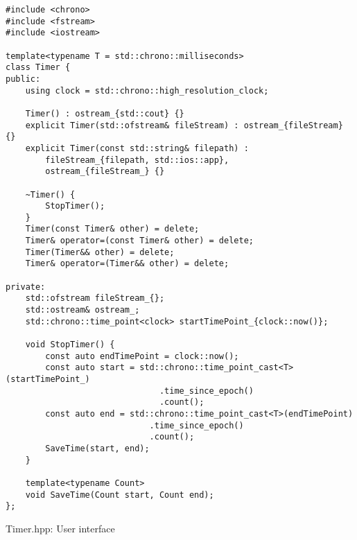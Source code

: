 \begin{listing}[!htb]
\begin{verbatim}
#include <chrono>
#include <fstream>
#include <iostream>

template<typename T = std::chrono::milliseconds>
class Timer {
public:
    using clock = std::chrono::high_resolution_clock;

    Timer() : ostream_{std::cout} {}
    explicit Timer(std::ofstream& fileStream) : ostream_{fileStream} {}
    explicit Timer(const std::string& filepath) :
        fileStream_{filepath, std::ios::app},
        ostream_{fileStream_} {}

    ~Timer() {
        StopTimer();
    }
    Timer(const Timer& other) = delete;
    Timer& operator=(const Timer& other) = delete;
    Timer(Timer&& other) = delete;
    Timer& operator=(Timer&& other) = delete;

private:
    std::ofstream fileStream_{};
    std::ostream& ostream_;
    std::chrono::time_point<clock> startTimePoint_{clock::now()};

    void StopTimer() {
        const auto endTimePoint = clock::now();
        const auto start = std::chrono::time_point_cast<T>(startTimePoint_)
                               .time_since_epoch()
                               .count();
        const auto end = std::chrono::time_point_cast<T>(endTimePoint)
                             .time_since_epoch()
                             .count();
        SaveTime(start, end);
    }

    template<typename Count>
    void SaveTime(Count start, Count end);
};
\end{verbatim}
\caption{Timer.hpp: User interface}
\label{lst:timer_interface}
\end{listing}

